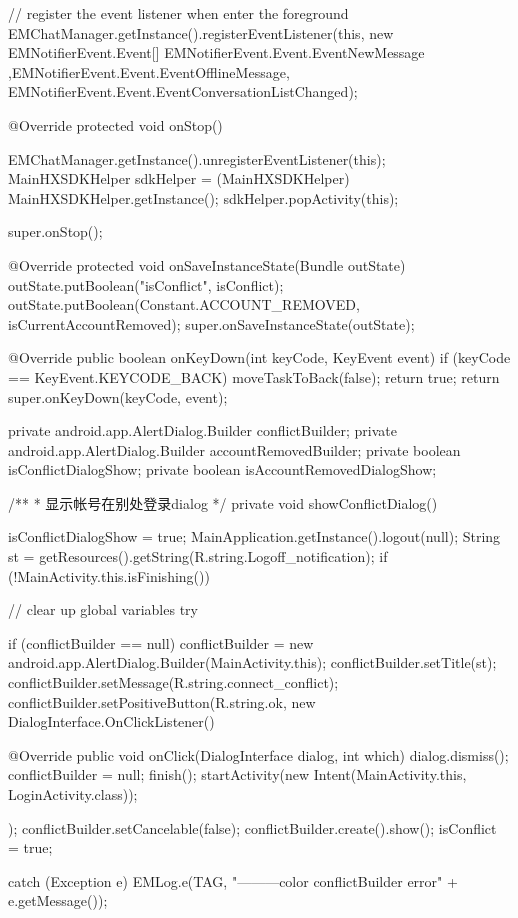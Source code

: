 {{		// register the event listener when enter the foreground
		EMChatManager.getInstance().registerEventListener(this,
				new EMNotifierEvent.Event[] { EMNotifierEvent.Event.EventNewMessage ,EMNotifierEvent.Event.EventOfflineMessage, EMNotifierEvent.Event.EventConversationListChanged});
	}

	@Override
	protected void onStop() {
		EMChatManager.getInstance().unregisterEventListener(this);
		MainHXSDKHelper sdkHelper = (MainHXSDKHelper) MainHXSDKHelper.getInstance();
		sdkHelper.popActivity(this);

		super.onStop();
	}

	@Override
	protected void onSaveInstanceState(Bundle outState) {
		outState.putBoolean("isConflict", isConflict);
		outState.putBoolean(Constant.ACCOUNT_REMOVED, isCurrentAccountRemoved);
		super.onSaveInstanceState(outState);
	}

	@Override
	public boolean onKeyDown(int keyCode, KeyEvent event) {
		if (keyCode == KeyEvent.KEYCODE_BACK) {
			moveTaskToBack(false);
			return true;
		}
		return super.onKeyDown(keyCode, event);
	}

	private android.app.AlertDialog.Builder conflictBuilder;
	private android.app.AlertDialog.Builder accountRemovedBuilder;
	private boolean isConflictDialogShow;
	private boolean isAccountRemovedDialogShow;

	/**
	 * 显示帐号在别处登录dialog
	 */
	private void showConflictDialog() {
		isConflictDialogShow = true;
		MainApplication.getInstance().logout(null);
		String st = getResources().getString(R.string.Logoff_notification);
		if (!MainActivity.this.isFinishing()) {
			// clear up global variables
			try {
				if (conflictBuilder == null)
					conflictBuilder = new android.app.AlertDialog.Builder(MainActivity.this);
				conflictBuilder.setTitle(st);
				conflictBuilder.setMessage(R.string.connect_conflict);
				conflictBuilder.setPositiveButton(R.string.ok, new DialogInterface.OnClickListener() {

					@Override
					public void onClick(DialogInterface dialog, int which) {
						dialog.dismiss();
						conflictBuilder = null;
						finish();
						startActivity(new Intent(MainActivity.this, LoginActivity.class));
					}
				});
				conflictBuilder.setCancelable(false);
				conflictBuilder.create().show();
				isConflict = true;
			} catch (Exception e) {
				EMLog.e(TAG, "---------color conflictBuilder error" + e.getMessage());
			}

		}

	}

}
